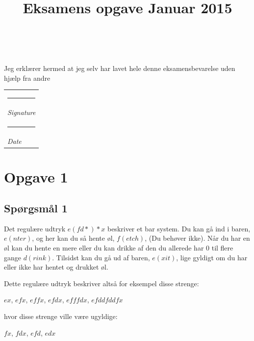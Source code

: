 \documentclass[danish,a4paper]{report}
\title{\Huge \textbf{\titlename}\\\huge Eksamens opgave Januar 2015}
\author{\textsc{\name} \\ \textsc{\email}}
\makeatletter
\newcommand{\namesigdate}[2][10cm]{%
  \begin{tabular}{@{}p{#1}@{}}
    #2 \\[2\normalbaselineskip] \hrule \\[0pt]
    {\small \textit{Signature}} \\[2\normalbaselineskip] \hrule \\[0pt]
    {\small \textit{Date}}
  \end{tabular}
}
\makeatother
\begin{document}
\maketitle

\vspace*{\fill}
\begin{center}
\begin{large}
Jeg erklærer hermed at jeg selv har lavet hele denne eksamensbevarelse uden hjælp fra andre
\end{large}

\vspace*{2cm}
\namesigdate{}
\end{center}

\vspace*{\fill}


\newpage

\chapter*{Opgave 1}
\section*{Spørgsmål 1}
Det regulære udtryk $e(fd*)*x$ beskriver et bar system. Du kan gå ind i baren, $e(nter)$, og her kan du så hente øl, $f(etch)$, (Du behøver ikke). Når du har en øl kan du hente en mere eller du kan drikke af den du allerede har 0 til flere gange $d(rink)$. Tilsidst kan du gå ud af baren, $e(xit)$, lige gyldigt om du har eller ikke har hentet og drukket øl.

Dette regulære udtryk beskriver altså for eksempel disse strenge:
\begin{center}$ ex$,
$efx$,
$effx$,
$efdx$,
$efffdx$,
$efddfddfx$
\end{center}
hvor disse strenge ville være ugyldige:
\begin{center}
$fx$,
$fdx$,
$efd$,
$edx$
\end{center}
\end{document}
